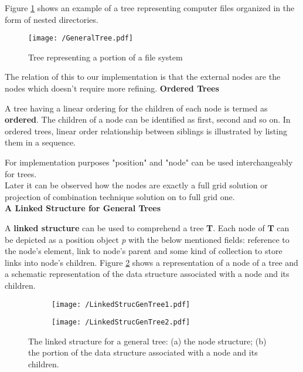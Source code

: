 		Figure \ref{fig:GeneralTree} shows an example of a tree representing computer files organized in the form of nested directories. 
		
		\begin{figure}[h]
			\centering
			\texttt{[image: /GeneralTree.pdf]}
			\caption{Tree representing a portion of a file system}
			\label{fig:GeneralTree}
		\end{figure}
		The relation of this to our implementation is that the external nodes are the nodes which doesn't require more refining.
		\textbf{Ordered Trees}
		
		A tree having a linear ordering for the children of each node is termed as \textbf{ordered}. The children of a node can be identified as first, second and so on. In ordered trees, linear order relationship between siblings is illustrated by listing them in a sequence.
		
		For implementation purposes "position" and "node" can be used interchangeably for trees. \\
		
		Later it can be observed how the nodes are exactly a full grid solution or projection of combination technique solution on to full grid one.\\
		\textbf{A Linked Structure for General Trees}
		
		A \textbf{linked structure} can be used to comprehend a tree \textbf{T}. Each node of \textbf{T} can be depicted as a position object \textit{p} with the below mentioned fields:
		reference to the node's element, link to node's parent and some kind of collection to store links into node's children.  Figure \ref{fig:LinkedStrucGenTree} shows a representation of  a node of a tree and a schematic representation of the data structure associated with a node and its children. \\
		
		\begin{figure}[h]
			\centering
		    \begin{subfigure}[b]{0.33\textwidth}
			    \texttt{[image: /LinkedStrucGenTree1.pdf]}
				\centering
		        \caption{}
		    \end{subfigure} 
		    \begin{subfigure}[b]{0.66\textwidth}    
			    \texttt{[image: /LinkedStrucGenTree2.pdf]}
				\centering    
			 \caption{}
		    \end{subfigure} 
		    \caption{The linked structure for a general tree: (a) the node structure; (b) the portion of the data structure associated with a node and its children.}
		    \label{fig:LinkedStrucGenTree}
		\end{figure}
		
